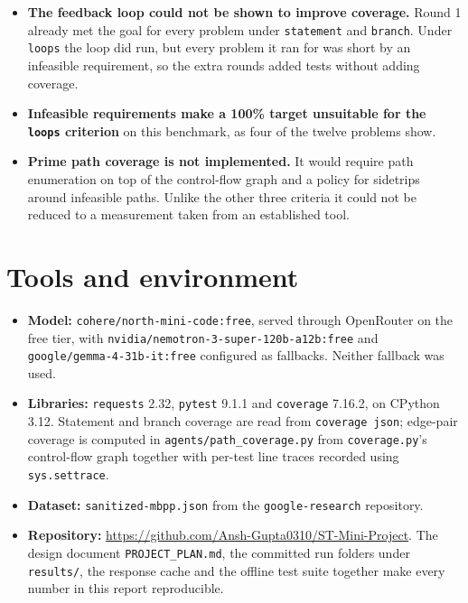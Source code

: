 \documentclass[11pt,a4paper]{article}
\begin{document}
\begin{itemize}\itemsep3pt
  \item \textbf{The feedback loop could not be shown to improve coverage.} Round 1 already met the goal for
        every problem under \texttt{statement} and \texttt{branch}. Under \texttt{loops} the loop did run, but
        every problem it ran for was short by an infeasible requirement, so the extra rounds added tests
        without adding coverage.
  \item \textbf{Infeasible requirements make a 100\% target unsuitable for the \texttt{loops} criterion} on
        this benchmark, as four of the twelve problems show.
  \item \textbf{Prime path coverage is not implemented.} It would require path enumeration on top of the
        control-flow graph and a policy for sidetrips around infeasible paths. Unlike the other three criteria
        it could not be reduced to a measurement taken from an established tool.
\end{itemize}

\section{Tools and environment}

\begin{itemize}\itemsep2pt
  \item \textbf{Model:} \texttt{cohere/north-mini-code:free}, served through OpenRouter on the free tier, with
        \texttt{nvidia/nemotron-3-super-120b-a12b:free} and \texttt{google/gemma-4-31b-it:free} configured as
        fallbacks. Neither fallback was used.
  \item \textbf{Libraries:} \texttt{requests} 2.32, \texttt{pytest} 9.1.1 and \texttt{coverage} 7.16.2, on
        CPython 3.12. Statement and branch coverage are read from \texttt{coverage json}; edge-pair coverage is
        computed in \texttt{agents/path\_coverage.py} from \texttt{coverage.py}'s control-flow graph together
        with per-test line traces recorded using \texttt{sys.settrace}.
  \item \textbf{Dataset:} \texttt{sanitized-mbpp.json} from the \texttt{google-research} repository.
  \item \textbf{Repository:} \url{https://github.com/Ansh-Gupta0310/ST-Mini-Project}. The design document
        \texttt{PROJECT\_PLAN.md}, the committed run folders under \texttt{results/}, the response cache and
        the offline test suite together make every number in this report reproducible.
\end{itemize}
\end{document}
